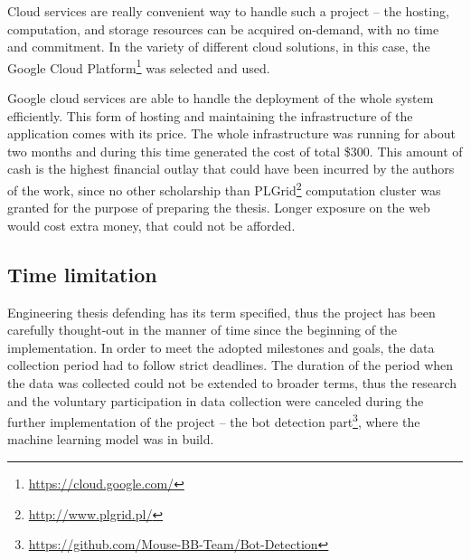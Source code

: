 Cloud services are really convenient way to handle such a project – the hosting, computation, and storage resources can be acquired on-demand, with no time and commitment.
In the variety of different cloud solutions, in this case, the Google Cloud Platform\footnote{\url{https://cloud.google.com/}} was selected and used.

Google cloud services are able to handle the deployment of the whole system efficiently.
This form of hosting and maintaining the infrastructure of the application comes with its price.
The whole infrastructure was running for about two months and during this time generated the cost of total \$\num{300}.
This amount of cash is the highest financial outlay that could have been incurred by the authors of the work, since no other scholarship than PLGrid\footnote{\url{http://www.plgrid.pl/}} computation cluster was granted for the purpose of preparing the thesis.
Longer exposure on the web would cost extra money, that could not be afforded.

\subsection{Time limitation}\label{subsec:time-limitation}
Engineering thesis defending has its term specified, thus the project has been carefully thought-out in the manner of time since the beginning of the implementation.
In order to meet the adopted milestones and goals, the data collection period had to follow strict deadlines.
The duration of the period when the data was collected could not be extended to broader terms, thus the research and the voluntary participation in data collection were canceled during the further implementation of the project – the bot detection part\footnote{\url{https://github.com/Mouse-BB-Team/Bot-Detection}}, where the machine learning model was in build.
